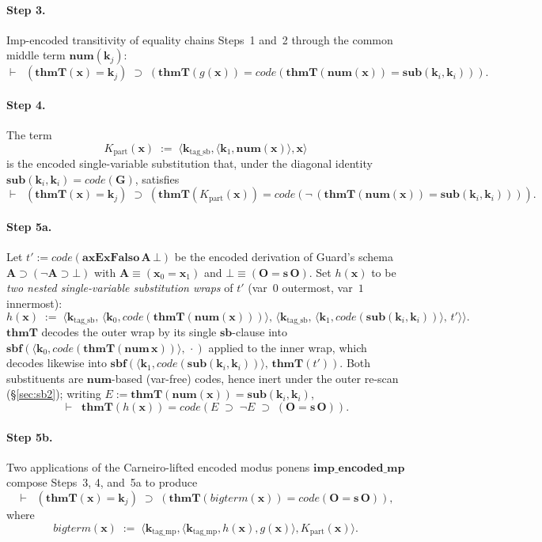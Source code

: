 \documentclass[11pt]{article}
\theoremstyle{plain}
\theoremstyle{definition}
\theoremstyle{remark}
\newcommand{\code}[1]{\mathit{code}(#1)}
\newcommand{\sub}{\mathbf{sub}}
\newcommand{\sbf}{\mathbf{sbf}}
\newcommand{\thmT}{\mathbf{thmT}}
\newcommand{\num}{\mathbf{num}}
\newcommand{\seq}[1]{\langle #1 \rangle}
\begin{document}
\paragraph{Step 3.}  Imp-encoded transitivity of equality chains
Steps~1 and~2 through the common middle term $\num(\mathbf{k}_j)$:
\[
\vdash \;\;(\thmT(\mathbf{x}) = \mathbf{k}_j) \;\supset\; (\thmT(g(\mathbf{x})) = \code{\thmT(\num(\mathbf{x})) = \sub(\mathbf{k}_i, \mathbf{k}_i)}).
\]

\paragraph{Step 4.}  The term
\[
K_{\mathrm{part}}(\mathbf{x}) \;:=\; \seq{\mathbf{k}_{\mathrm{tag\_sb}}, \seq{\mathbf{k}_1, \num(\mathbf{x})}, \mathbf{x}}
\]
is the encoded single-variable substitution that, under the diagonal
identity $\sub(\mathbf{k}_i, \mathbf{k}_i) = \code{\mathbf{G}}$,
satisfies
\[
\vdash \;\;(\thmT(\mathbf{x}) = \mathbf{k}_j) \;\supset\; (\thmT(K_{\mathrm{part}}(\mathbf{x})) = \code{\neg\,(\thmT(\num(\mathbf{x})) = \sub(\mathbf{k}_i, \mathbf{k}_i))}).
\]

\paragraph{Step 5a.}  Let $t' := \code{\mathbf{axExFalso}\,\mathbf{A}\,\bot}$
be the encoded derivation of Guard's schema $\mathbf{A} \supset
(\neg \mathbf{A} \supset \bot)$ with $\mathbf{A} \equiv (\mathbf{x}_0
= \mathbf{x}_1)$ and $\bot \equiv (\mathbf{O} = \mathbf{s}\,\mathbf{O})$.
Set $h(\mathbf{x})$ to be \emph{two nested single-variable substitution
wraps} of $t'$ (var~$0$ outermost, var~$1$ innermost):
\[
h(\mathbf{x}) \;:=\; \seq{\mathbf{k}_{\mathrm{tag\_sb}},\, \seq{\mathbf{k}_0, \code{\thmT(\num(\mathbf{x}))}},\,
   \seq{\mathbf{k}_{\mathrm{tag\_sb}},\, \seq{\mathbf{k}_1, \code{\sub(\mathbf{k}_i, \mathbf{k}_i)}},\, t'}}.
\]
$\thmT$ decodes the outer wrap by its single $\mathbf{sb}$-clause into
$\sbf(\seq{\mathbf{k}_0, \code{\thmT(\num\,\mathbf{x})}},\, \cdot)$ applied to
the inner wrap, which decodes likewise into
$\sbf(\seq{\mathbf{k}_1, \code{\sub(\mathbf{k}_i,\mathbf{k}_i)}},\, \thmT(t'))$.
Both substituents are $\num$-based (var-free) codes, hence inert under the
outer re-scan ({\S}\ref{sec:sb2}); writing
$E := \thmT(\num(\mathbf{x})) = \sub(\mathbf{k}_i, \mathbf{k}_i)$,
\[
\vdash \;\;\thmT(h(\mathbf{x})) = \code{E \;\supset\; \neg E \;\supset\; (\mathbf{O} = \mathbf{s}\,\mathbf{O})}.
\]

\paragraph{Step 5b.}  Two applications of the Carneiro-lifted encoded
modus ponens $\mathbf{imp\_encoded\_mp}$ compose Steps~3, 4, and~5a to
produce
\[
\vdash \;\;(\thmT(\mathbf{x}) = \mathbf{k}_j) \;\supset\; (\thmT(\mathit{bigterm}(\mathbf{x})) = \code{\mathbf{O} = \mathbf{s}\,\mathbf{O}}),
\]
where
\[
\mathit{bigterm}(\mathbf{x}) \;:=\; \seq{\mathbf{k}_{\mathrm{tag\_mp}}, \seq{\mathbf{k}_{\mathrm{tag\_mp}}, h(\mathbf{x}), g(\mathbf{x})}, K_{\mathrm{part}}(\mathbf{x})}.
\]
\end{document}
